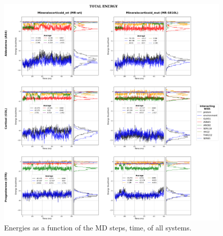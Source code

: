 \documentclass[
  journal=usp, %
  manuscript=final-report,
  year=2023,
  volume=1,
]{cup-journal}
\begin{document}
{\begin{figure}
\centering
\includegraphics[width=0.99\linewidth]{Images/Energies.png}
\caption{Energies as a function of the MD steps, time, of all systems.}
\label{MD_energies}
\end{figure}


}



\printendnotes
\clearpage
\onecolumn{
%
\printbibliography
\nocite{*}
}
\end{document}
